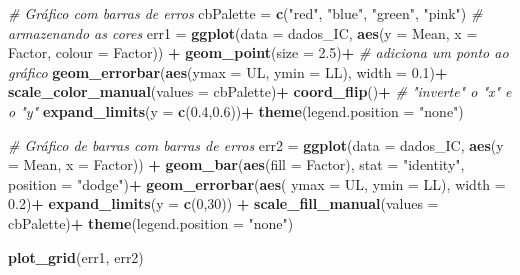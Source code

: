 \documentclass[
]{book}
\newenvironment{Shaded}{\begin{snugshade}}{\end{snugshade}}
\newcommand{\CommentTok}[1]{\textcolor[rgb]{0.56,0.35,0.01}{\textit{#1}}}
\newcommand{\DataTypeTok}[1]{\textcolor[rgb]{0.13,0.29,0.53}{#1}}
\newcommand{\DecValTok}[1]{\textcolor[rgb]{0.00,0.00,0.81}{#1}}
\newcommand{\FloatTok}[1]{\textcolor[rgb]{0.00,0.00,0.81}{#1}}
\newcommand{\KeywordTok}[1]{\textcolor[rgb]{0.13,0.29,0.53}{\textbf{#1}}}
\newcommand{\NormalTok}[1]{#1}
\newcommand{\OperatorTok}[1]{\textcolor[rgb]{0.81,0.36,0.00}{\textbf{#1}}}
\newcommand{\StringTok}[1]{\textcolor[rgb]{0.31,0.60,0.02}{#1}}
\numberwithin{equation}{section}
\begin{document}
\begin{Shaded}
\begin{Highlighting}[]
\CommentTok{\# Gráfico com barras de erros}
\NormalTok{cbPalette =}\StringTok{ }\KeywordTok{c}\NormalTok{(}\StringTok{"red"}\NormalTok{, }\StringTok{"blue"}\NormalTok{, }\StringTok{"green"}\NormalTok{, }\StringTok{"pink"}\NormalTok{) }\CommentTok{\# armazenando as cores}
\NormalTok{err1 =}\StringTok{ }\KeywordTok{ggplot}\NormalTok{(}\DataTypeTok{data =}\NormalTok{ dados\_IC, }\KeywordTok{aes}\NormalTok{(}\DataTypeTok{y =}\NormalTok{ Mean, }\DataTypeTok{x =}\NormalTok{ Factor, }\DataTypeTok{colour =}\NormalTok{ Factor)) }\OperatorTok{+}\StringTok{ }
\StringTok{              }\KeywordTok{geom\_point}\NormalTok{(}\DataTypeTok{size =} \FloatTok{2.5}\NormalTok{)}\OperatorTok{+}\StringTok{ }\CommentTok{\# adiciona um ponto ao gráfico}
\StringTok{              }\KeywordTok{geom\_errorbar}\NormalTok{(}\KeywordTok{aes}\NormalTok{(}\DataTypeTok{ymax =}\NormalTok{ UL, }\DataTypeTok{ymin =}\NormalTok{ LL), }\DataTypeTok{width =} \FloatTok{0.1}\NormalTok{)}\OperatorTok{+}
\StringTok{              }\KeywordTok{scale\_color\_manual}\NormalTok{(}\DataTypeTok{values =}\NormalTok{ cbPalette)}\OperatorTok{+}\StringTok{ }
\StringTok{              }\KeywordTok{coord\_flip}\NormalTok{()}\OperatorTok{+}\StringTok{ }\CommentTok{\# "inverte" o "x" e o "y" }
\StringTok{              }\KeywordTok{expand\_limits}\NormalTok{(}\DataTypeTok{y =} \KeywordTok{c}\NormalTok{(}\FloatTok{0.4}\NormalTok{,}\FloatTok{0.6}\NormalTok{))}\OperatorTok{+}
\StringTok{              }\KeywordTok{theme}\NormalTok{(}\DataTypeTok{legend.position =} \StringTok{"none"}\NormalTok{)}

\CommentTok{\# Gráfico de barras com barras de erros }
\NormalTok{err2 =}\StringTok{ }\KeywordTok{ggplot}\NormalTok{(}\DataTypeTok{data =}\NormalTok{ dados\_IC, }\KeywordTok{aes}\NormalTok{(}\DataTypeTok{y =}\NormalTok{ Mean, }\DataTypeTok{x =}\NormalTok{ Factor)) }\OperatorTok{+}\StringTok{ }
\StringTok{              }\KeywordTok{geom\_bar}\NormalTok{(}\KeywordTok{aes}\NormalTok{(}\DataTypeTok{fill =}\NormalTok{ Factor), }\DataTypeTok{stat =} \StringTok{"identity"}\NormalTok{, }\DataTypeTok{position =} \StringTok{"dodge"}\NormalTok{)}\OperatorTok{+}
\StringTok{              }\KeywordTok{geom\_errorbar}\NormalTok{(}\KeywordTok{aes}\NormalTok{( }\DataTypeTok{ymax =}\NormalTok{ UL, }\DataTypeTok{ymin =}\NormalTok{ LL), }\DataTypeTok{width =} \FloatTok{0.2}\NormalTok{)}\OperatorTok{+}
\StringTok{              }\KeywordTok{expand\_limits}\NormalTok{(}\DataTypeTok{y =} \KeywordTok{c}\NormalTok{(}\DecValTok{0}\NormalTok{,}\DecValTok{30}\NormalTok{)) }\OperatorTok{+}
\StringTok{              }\KeywordTok{scale\_fill\_manual}\NormalTok{(}\DataTypeTok{values =}\NormalTok{ cbPalette)}\OperatorTok{+}
\StringTok{              }\KeywordTok{theme}\NormalTok{(}\DataTypeTok{legend.position =} \StringTok{"none"}\NormalTok{)}

\KeywordTok{plot\_grid}\NormalTok{(err1, err2)}
\end{Highlighting}
\end{Shaded}
\end{document}
